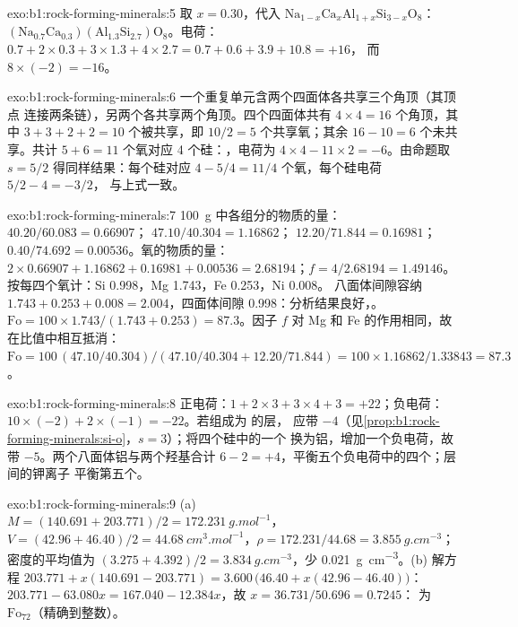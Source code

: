 \begin{solution}{exo:b1:rock-forming-minerals:5}
取 $x = 0.30$，代入 $\mathrm{Na}_{1-x}\mathrm{Ca}_x\mathrm{Al}_{1+x}\mathrm{Si}_{3-x}\mathrm{O}_8$：
$\mathrm{(Na_{0.7}Ca_{0.3})(Al_{1.3}Si_{2.7})O_8}$。电荷：
$0.7 + 2\times0.3 + 3\times1.3 + 4\times2.7 = 0.7 + 0.6 + 3.9 + 10.8 = +16$，
而 $8\times(-2) = -16$。
\end{solution}

\begin{solution}{exo:b1:rock-forming-minerals:6}
一个重复单元含两个四面体各共享三个角顶（其顶点
连接两条链），另两个各共享两个角顶。四个四面体共有
$4\times4 = 16$ 个角顶，其中 $3 + 3 + 2 + 2 = 10$ 个被共享，即
$10/2 = 5$ 个共享氧；其余 $16 - 10 = 6$ 个未共享。共计
$5 + 6 = 11$ 个氧对应 4 个硅：，电荷为
$4\times4 - 11\times2 = -6$。由命题取
$s = 5/2$ 得同样结果：每个硅对应 $4 - 5/4 = 11/4$ 个氧，每个硅电荷 $5/2 - 4 = -3/2$，
与上式一致。
\end{solution}

\begin{solution}{exo:b1:rock-forming-minerals:7}
\qty{100}{g} 中各组分的物质的量： $40.20/60.083 = 0.66907$；
$47.10/40.304 = 1.16862$； $12.20/71.844 = 0.16981$；
$0.40/74.692 = 0.00536$。氧的物质的量：$2\times0.66907 + 1.16862 + 0.16981 +
0.00536 = 2.68194$；$f = 4/2.68194 = 1.49146$。按每四个氧计：Si
\num{0.998}，Mg \num{1.743}，Fe \num{0.253}，Ni \num{0.008}。
八面体间隙容纳 $1.743 + 0.253 + 0.008 = 2.004$，四面体间隙
\num{0.998}：分析结果良好，。
$\mathrm{Fo} = 100\times1.743/(1.743 + 0.253) = 87.3$。因子 $f$
对 Mg 和 Fe 的作用相同，故在比值中相互抵消：
$\mathrm{Fo} = 100\,(47.10/40.304)/(47.10/40.304 + 12.20/71.844) =
100\times1.16862/1.33843 = 87.3$。
\end{solution}

\begin{solution}{exo:b1:rock-forming-minerals:8}
正电荷：$1 + 2\times3 + 3\times4 + 3 = +22$；负电荷：
$10\times(-2) + 2\times(-1) = -22$。若组成为  的层，
应带 $-4$（见\cref{prop:b1:rock-forming-minerals:si-o}，$s = 3$）；将四个硅中的一个
换为铝，增加一个负电荷，故 
带 $-5$。两个八面体铝与两个羟基合计
$6 - 2 = +4$，平衡五个负电荷中的四个；层间的钾离子
平衡第五个。
\end{solution}

\begin{solution}{exo:b1:rock-forming-minerals:9}
(a) $M = (140.691 + 203.771)/2 = \qty{172.231}{g.mol^{-1}}$，$V = (42.96 +
46.40)/2 = \qty{44.68}{cm^3.mol^{-1}}$，$\rho = 172.231/44.68 =
\qty{3.855}{g.cm^{-3}}$；密度的平均值为 $(3.275 + 4.392)/2 =
\qty{3.834}{g.cm^{-3}}$，少 \qty{0.021}{g.cm^{-3}}。(b) 解方程
$203.771 + x(140.691 - 203.771) = 3.600\,\bigl(46.40 + x(42.96 - 46.40)\bigr)$：
$203.771 - 63.080x = 167.040 - 12.384x$，故 $x = 36.731/50.696 = 0.7245$：
为 $\text{Fo}_{72}$（精确到整数）。
\end{solution}

